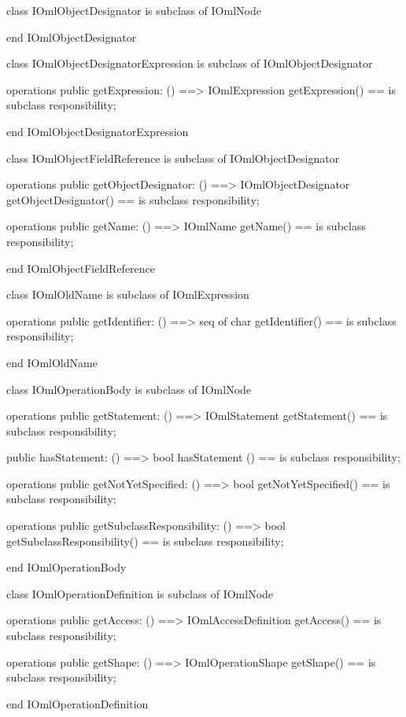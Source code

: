 \begin{vdm_al}
class IOmlObjectDesignator
 is subclass of IOmlNode

end IOmlObjectDesignator
\end{vdm_al}

\begin{vdm_al}
class IOmlObjectDesignatorExpression
 is subclass of IOmlObjectDesignator

operations
  public getExpression: () ==> IOmlExpression
  getExpression() == is subclass responsibility;

end IOmlObjectDesignatorExpression
\end{vdm_al}

\begin{vdm_al}
class IOmlObjectFieldReference
 is subclass of IOmlObjectDesignator

operations
  public getObjectDesignator: () ==> IOmlObjectDesignator
  getObjectDesignator() == is subclass responsibility;

operations
  public getName: () ==> IOmlName
  getName() == is subclass responsibility;

end IOmlObjectFieldReference
\end{vdm_al}

\begin{vdm_al}
class IOmlOldName
 is subclass of IOmlExpression

operations
  public getIdentifier: () ==> seq of char
  getIdentifier() == is subclass responsibility;

end IOmlOldName
\end{vdm_al}

\begin{vdm_al}
class IOmlOperationBody
 is subclass of IOmlNode

operations
  public getStatement: () ==> IOmlStatement
  getStatement() == is subclass responsibility;

  public hasStatement: () ==> bool
  hasStatement () == is subclass responsibility;

operations
  public getNotYetSpecified: () ==> bool
  getNotYetSpecified() == is subclass responsibility;

operations
  public getSubclassResponsibility: () ==> bool
  getSubclassResponsibility() == is subclass responsibility;

end IOmlOperationBody
\end{vdm_al}

\begin{vdm_al}
class IOmlOperationDefinition
 is subclass of IOmlNode

operations
  public getAccess: () ==> IOmlAccessDefinition
  getAccess() == is subclass responsibility;

operations
  public getShape: () ==> IOmlOperationShape
  getShape() == is subclass responsibility;

end IOmlOperationDefinition
\end{vdm_al}

